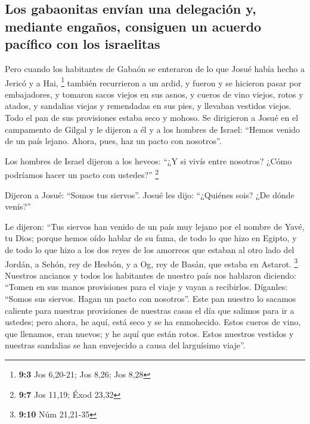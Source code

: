 \hypertarget{los-gabaonitas-envuxedan-una-delegaciuxf3n-y-mediante-engauxf1os-consiguen-un-acuerdo-pacuxedfico-con-los-israelitas}{%
\subsection{Los gabaonitas envían una delegación y, mediante engaños,
consiguen un acuerdo pacífico con los
israelitas}\label{los-gabaonitas-envuxedan-una-delegaciuxf3n-y-mediante-engauxf1os-consiguen-un-acuerdo-pacuxedfico-con-los-israelitas}}

 Pero cuando los habitantes de Gabaón se enteraron de lo
que Josué había hecho a Jericó y a Hai, \footnote{\textbf{9:3} Jos
  6,20-21; Jos 8,26; Jos 8,28}  también recurrieron a un
ardid, y fueron y se hicieron pasar por embajadores, y tomaron sacos
viejos en sus asnos, y cueros de vino viejos, rotos y atados,
 y sandalias viejas y remendadas en sus pies, y llevaban
vestidos viejos. Todo el pan de sus provisiones estaba seco y mohoso.
 Se dirigieron a Josué en el campamento de Gilgal y le
dijeron a él y a los hombres de Israel: ``Hemos venido de un país
lejano. Ahora, pues, haz un pacto con nosotros''.

 Los hombres de Israel dijeron a los heveos: ``¿Y si vivís
entre nosotros? ¿Cómo podríamos hacer un pacto con ustedes?''
\footnote{\textbf{9:7} Jos 11,19; Éxod 23,32}

 Dijeron a Josué: ``Somos tus siervos''. Josué les dijo:
``¿Quiénes sois? ¿De dónde venís?''

 Le dijeron: ``Tus siervos han venido de un país muy
lejano por el nombre de Yavé, tu Dios; porque hemos oído hablar de su
fama, de todo lo que hizo en Egipto,  y de todo lo que
hizo a los dos reyes de los amorreos que estaban al otro lado del
Jordán, a Sehón, rey de Hesbón, y a Og, rey de Basán, que estaba en
Astarot. \footnote{\textbf{9:10} Núm 21,21-35}  Nuestros
ancianos y todos los habitantes de nuestro país nos hablaron diciendo:
``Tomen en sus manos provisiones para el viaje y vayan a recibirlos.
Díganles: ``Somos sus siervos. Hagan un pacto con nosotros''.
 Este pan nuestro lo sacamos caliente para nuestras
provisiones de nuestras casas el día que salimos para ir a ustedes; pero
ahora, he aquí, está seco y se ha enmohecido.  Estos
cueros de vino, que llenamos, eran nuevos; y he aquí que están rotos.
Estos nuestros vestidos y nuestras sandalias se han envejecido a causa
del larguísimo viaje''.

